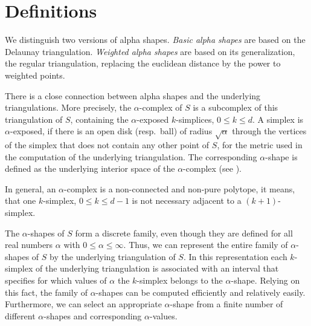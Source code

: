 \section{Definitions}


We distinguish two versions of alpha shapes.  {\em Basic alpha shapes}
are based on the Delaunay triangulation.  {\em Weighted alpha shapes}
are based on its generalization, the regular triangulation, replacing
the euclidean distance by the power to weighted points. 


There is a close connection between alpha shapes and the underlying
triangulations. More precisely, the $\alpha$-complex of $S$ is a
subcomplex of this triangulation of $S$, containing the $\alpha$-exposed
$k$-simplices, $0 \leq k \leq d$. A simplex is $\alpha$-exposed, if there is an
open disk (resp.\ ball) of radius $\sqrt{\alpha}$ through the vertices of the
simplex that does not contain any other point of $S$, for the metric used in
the computation of the underlying triangulation.  The corresponding
$\alpha$-shape is defined as the underlying interior space of the
$\alpha$-complex (see \cite{em-tdas-94}). 

In general, an $\alpha$-complex is a non-connected and non-pure polytope, it
means, that one $k$-simplex, $0 \leq k \leq d-1$ is not necessary adjacent to
a $(k+1)$-simplex.

The $\alpha$-shapes of $S$ form a discrete family, even though they
are defined for all real numbers $\alpha$ with $0 \leq \alpha
\leq \infty$. Thus, we can represent the entire family of $\alpha$-shapes
of $S$ by the underlying triangulation of $S$. In this representation
each $k$-simplex of the underlying triangulation is associated with an
interval that specifies for which values of $\alpha$ the $k$-simplex
belongs to the $\alpha$-shape. Relying on this fact, the family of
$\alpha$-shapes can be computed efficiently and relatively
easily. Furthermore, we can select an appropriate $\alpha$-shape from a
finite number of different $\alpha$-shapes and corresponding
$\alpha$-values.



